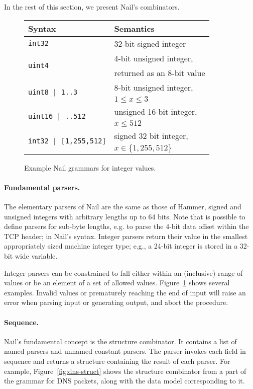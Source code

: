 \noindent
In the rest of this section, we present Nail's combinators.

\begin{figure}[tb]
\begin{tabular}{ll}
\toprule
\bf Syntax & \bf Semantics \\
\midrule
\texttt{int32} & 32-bit signed integer \\
\multirow{2}{*}{\texttt{uint4}}
  & 4-bit unsigned integer, \\
  & returned as an 8-bit value \\
\multirow{2}{*}{\texttt{uint8 | 1..3}}
  & 8-bit unsigned integer, \\
  & $1\leq x \leq 3$ \\
\multirow{2}{*}{\texttt{uint16 | ..512}}
  & unsigned 16-bit integer, \\
  & $x \leq 512$ \\
\multirow{2}{*}{\texttt{int32 | [1,255,512]}}
  & signed 32 bit integer, \\
  & $x \in \{ 1, 255, 512 \}$ \\
\bottomrule
\end{tabular}
\caption{Example Nail grammars for integer values.}
\label{fig:range}
\end{figure}

\paragraph{Fundamental parsers.}
The elementary parsers of Nail are the same as those of Hammer, signed
and unsigned integers with arbitrary lengths up to 64 bits.  Note that is
possible to define parsers for sub-byte lengths, e.g. to parse the 4-bit
data offset within the TCP header; in Nail's syntax.  Integer parsers
return their value in the smallest appropriately sized machine integer
type; e.g., a 24-bit integer is stored in a 32-bit wide variable.

Integer parsers can be constrained to fall either within an (inclusive)
range of values or be an element of a set of allowed values.
Figure~\ref{fig:range} shows several examples.
Invalid values or prematurely reaching the end of input will raise an
error when parsing input or generating output, and abort the procedure.


\paragraph{Sequence.}

Nail's fundamental concept is the structure combinator. It contains a list of
named parsers and unnamed constant parsers. The parser invokes each field 
in sequence and returns a structure containing the result of each parser.
For example, Figure~\ref{fig:dns-struct} shows the structure combinator
from a part of the grammar for DNS packets, along with the data model
corresponding to it.

